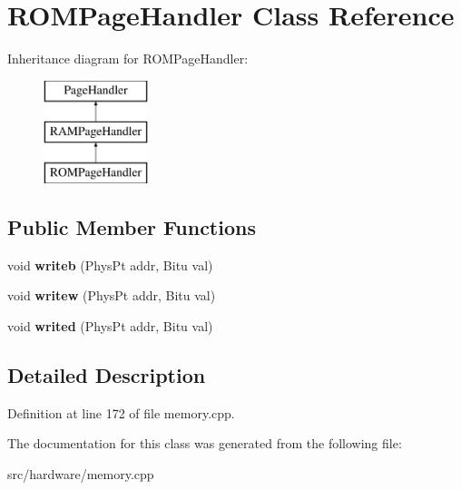 \hypertarget{classROMPageHandler}{\section{R\-O\-M\-Page\-Handler Class Reference}
\label{classROMPageHandler}
}
Inheritance diagram for R\-O\-M\-Page\-Handler\-:\begin{figure}[H]
\begin{center}
\leavevmode
\includegraphics[height=3.000000cm]{classROMPageHandler}
\end{center}
\end{figure}
\subsection*{Public Member Functions}
\begin{DoxyCompactItemize}
\item 
\hypertarget{classROMPageHandler_aa90d31661b26c6a867783e3b8d299a43}{void {\bfseries writeb} (Phys\-Pt addr, Bitu val)}\label{classROMPageHandler_aa90d31661b26c6a867783e3b8d299a43}

\item 
\hypertarget{classROMPageHandler_a244bd425de97ffb60a1dbe3dfc513190}{void {\bfseries writew} (Phys\-Pt addr, Bitu val)}\label{classROMPageHandler_a244bd425de97ffb60a1dbe3dfc513190}

\item 
\hypertarget{classROMPageHandler_a47071afe3d028a424094077efe3356e5}{void {\bfseries writed} (Phys\-Pt addr, Bitu val)}\label{classROMPageHandler_a47071afe3d028a424094077efe3356e5}

\end{DoxyCompactItemize}


\subsection{Detailed Description}


Definition at line 172 of file memory.\-cpp.



The documentation for this class was generated from the following file\-:\begin{DoxyCompactItemize}
\item 
src/hardware/memory.\-cpp\end{DoxyCompactItemize}
